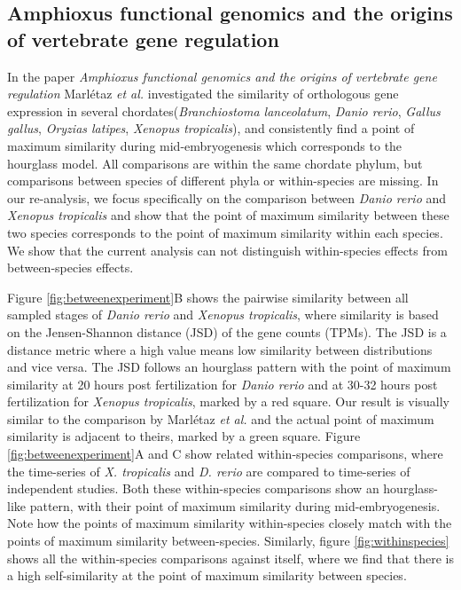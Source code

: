 \subsection{Amphioxus functional genomics and the origins of vertebrate gene regulation} \label{subsection:marletaz}

In the paper \textit{Amphioxus functional genomics and the origins of vertebrate gene regulation}\cite{marletaz2018} Marl\'etaz \textit{et al.} investigated the similarity of orthologous gene expression in several chordates(\textit{Branchiostoma lanceolatum}, \textit{Danio rerio}, \textit{Gallus gallus}, \textit{Oryzias latipes}, \textit{Xenopus tropicalis}), and consistently find a point of maximum similarity during mid-embryogenesis which corresponds to the hourglass model. All comparisons are within the same chordate phylum, but comparisons between species of different phyla or within-species are missing. In our re-analysis, we focus specifically on the comparison between \textit{Danio rerio} and \textit{Xenopus tropicalis} and show that the point of maximum similarity between these two species corresponds to the point of maximum similarity within each species. We show that the current analysis can not distinguish within-species effects from between-species effects.

Figure \ref{fig:betweenexperiment}B shows the pairwise similarity between all sampled stages of \textit{Danio rerio} and \textit{Xenopus tropicalis}, where similarity is based on the Jensen-Shannon distance (JSD) of the gene counts (TPMs). The JSD is a distance metric where a high value means low similarity between distributions and vice versa. The JSD follows an hourglass pattern with the point of maximum similarity at 20 hours post fertilization for \textit{Danio rerio} and at 30-32 hours post fertilization for \textit{Xenopus tropicalis}, marked by a red square. Our result is visually similar to the comparison by Marl\'etaz \textit{et al.} and the actual point of maximum similarity is adjacent to theirs, marked by a green square. Figure \ref{fig:betweenexperiment}A and C show related within-species comparisons, where the time-series of \textit{X. tropicalis} and \textit{D. rerio} are compared to time-series of independent studies\cite{Hu2017,White2017}. Both these within-species comparisons show an hourglass-like pattern, with their point of maximum similarity during mid-embryogenesis. Note how the points of maximum similarity within-species closely match with the points of maximum similarity between-species. Similarly, figure \ref{fig:withinspecies} shows all the within-species comparisons against itself, where we find that there is a high self-similarity at the point of maximum similarity between species. 

